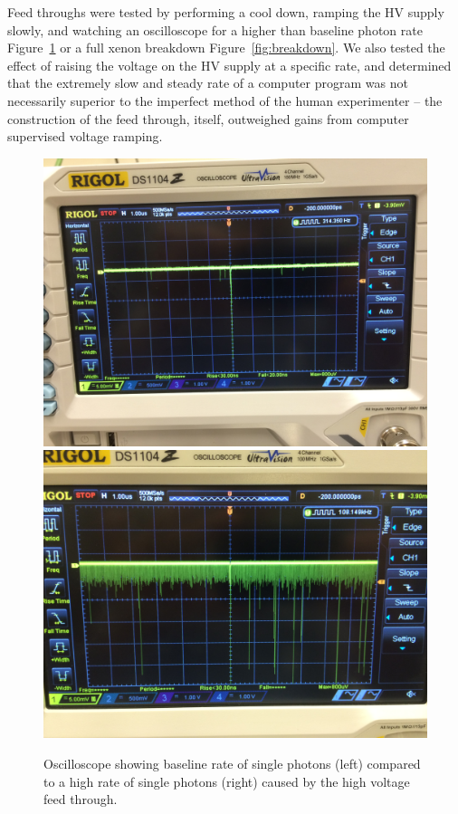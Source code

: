 Feed throughs were tested by performing a cool down, ramping the \ac{HV} supply slowly, and watching an oscilloscope for a higher than baseline photon rate Figure~\ref{fig:phog} or a full xenon breakdown Figure~\ref{fig:breakdown}. We also tested the effect of raising the voltage on the \ac{HV} supply at a specific rate, and determined that the extremely slow and steady rate of a computer program was not necessarily superior to the imperfect method of the human experimenter -- the construction of the feed through, itself, outweighed gains from computer supervised voltage ramping.  



\begin{figure}[htbp]
\begin{center}
\includegraphics[width=\halffig]{figures/testbed/baseline.jpg}
\includegraphics[width=\halffig]{figures/testbed/phog.jpg}
\caption{Oscilloscope showing baseline rate of single photons (left) compared to a high rate of single photons (right) caused by the high voltage feed through.}
\label{fig:phog}
\end{center}
\end{figure}



